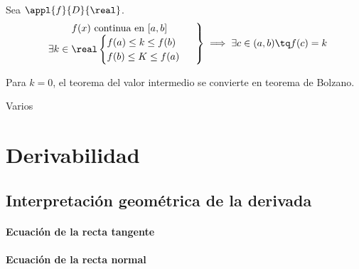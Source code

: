 \begin{theorem}
Sea $\appl{f}{D}{\real}$.
\[
\left.\begin{array}{c}f(x) \text{ continua en } [a,b]\\
\exists k\in\real \begin{cases}f(a)\leq k\leq f(b)\\f(b)\leq K \leq f(a)\end{cases}\end{array}\right\}\implies \exists c\in(a,b) \tq f(c) = k
\]
\end{theorem}

\obs Para $k=0$, el teorema del valor intermedio se convierte en teorema de Bolzano.

\begin{theorem}

\end{theorem}

\begin{problem}
Varios
\solution
\end{problem}


\section{Derivabilidad}

\begin{defn}

\end{defn}


\begin{defn}

\end{defn}

\begin{defn}

\end{defn}

\subsection{Interpretación geométrica de la derivada}

\paragraph{Ecuación de la recta tangente}

\paragraph{Ecuación de la recta normal}

